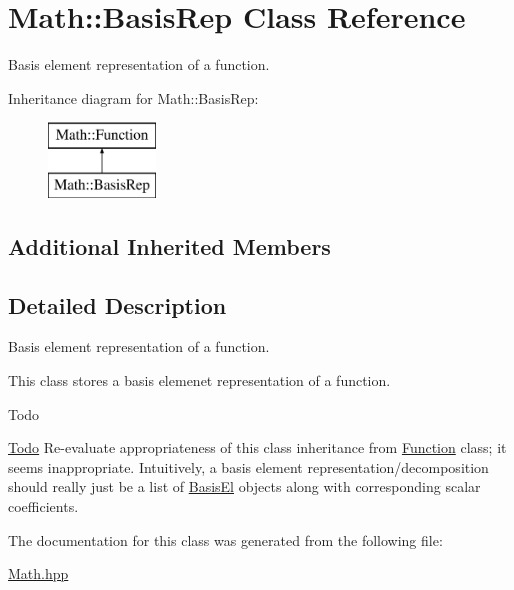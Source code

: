 \hypertarget{class_math_1_1_basis_rep}{}\section{Math\+:\+:Basis\+Rep Class Reference}
\label{class_math_1_1_basis_rep}


Basis element representation of a function.  


Inheritance diagram for Math\+:\+:Basis\+Rep\+:\begin{figure}[H]
\begin{center}
\leavevmode
\includegraphics[height=2.000000cm]{class_math_1_1_basis_rep}
\end{center}
\end{figure}
\subsection*{Additional Inherited Members}


\subsection{Detailed Description}
Basis element representation of a function. 

This class stores a basis elemenet representation of a function. \begin{DoxyRefDesc}{Todo}
\item[\mbox{\hyperlink{todo__todo000002}{Todo}}]Re-\/evaluate appropriateness of this class\textquotesingle{} inheritance from \mbox{\hyperlink{class_math_1_1_function}{Function}} class; it seems inappropriate. Intuitively, a basis element representation/decomposition should really just be a list of \mbox{\hyperlink{class_math_1_1_basis_el}{Basis\+El}} objects along with corresponding scalar coefficients. \end{DoxyRefDesc}


The documentation for this class was generated from the following file\+:\begin{DoxyCompactItemize}
\item 
\mbox{\hyperlink{_math_8hpp}{Math.\+hpp}}\end{DoxyCompactItemize}
